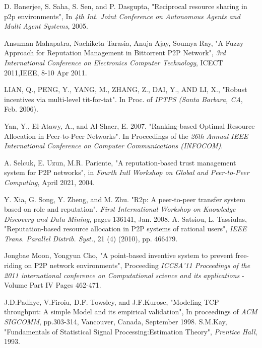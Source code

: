 \documentclass{IEEEtran}
\begin{document}
\begin{thebibliography}{1}
D. Banerjee, S. Saha, S. Sen, and P. Dasgupta, "Reciprocal resource
sharing in p2p environments", In \emph{4th Int. Joint Conference on Autonomous Agents and Multi Agent Systems}, 2005.

Ansuman Mahapatra, Nachiketa Tarasia, Anuja Ajay, Soumya Ray, "A Fuzzy
Approach for Reputation Management in Bittorrent P2P Network", \emph{3rd International Conference on Electronics Computer Technology}, ICECT 2011,IEEE, 8-10 Apr 2011.

LIAN, Q., PENG, Y., YANG, M., ZHANG, Z., DAI, Y., AND LI, X., "Robust
incentives via multi-level tit-for-tat". In Proc. of \emph{IPTPS (Santa Barbara, CA}, Feb. 2006).

Yan, Y., El-Atawy, A., and Al-Shaer, E. 2007. "Ranking-based Optimal
Resource Allocation in Peer-to-Peer Networks". In Proceedings of the \emph{26th Annual IEEE International Conference on Computer Communications (INFOCOM)}.

A. Selcuk, E. Uzun, M.R. Pariente, "A reputation-based trust management
system for P2P networks", in \emph{Fourth Intl Workshop on Global and Peer-to-Peer Computing}, April 2021, 2004.

Y. Xia, G. Song, Y. Zheng, and M. Zhu. "R2p: A peer-to-peer transfer system
based on role and reputation". \emph{First International Workshop on Knowledge Discovery and Data Mining}, pages 136141, Jan. 2008.
A. Satsiou, L. Tassiulas, "Reputation-based resource allocation in P2P
systems of rational users", \emph{IEEE Trans. Parallel Distrib. Syst.}, 21 (4) (2010),
pp. 466479.

Jongbae Moon, Yongyun Cho, "A point-based inventive system to prevent
free-riding on P2P network environments", Proceeding \emph{ICCSA'11 Proceedings of the 2011 international conference on Computational science and its applications} -
Volume Part IV Pages 462-471.


J.D.Padhye, V.Firoiu, D.F. Towsley, and J.F.Kurose, "Modeling TCP throughput: A simple Model and its empirical validation", In proceedings of \emph{ACM SIGCOMM}, pp.303-314, Vancouver, Canada, September 1998.
S.M.Kay, "Fundamentals of Statistical Signal Processing:Estimation
Theory", \emph{Prentice Hall}, 1993.

\end{thebibliography}
\end{document}
